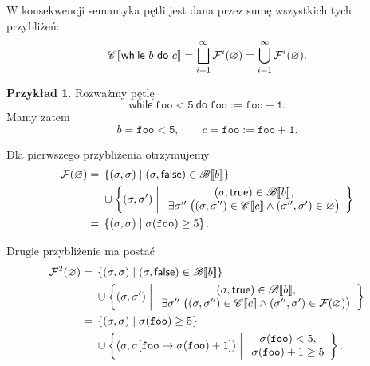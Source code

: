 \documentclass[11pt,a4paper]{article}
\theoremstyle{definition}
\newtheorem{przyklad}[definicja]{Przykład}
\theoremstyle{plain}
\DeclarePairedDelimiter{\semdelim}{\llbracket}{\rrbracket}
\newcommand{\sem}[1]{\semdelim{#1}}
\newcommand{\Cc}{\mathscr{C}}   %
\newcommand{\Bb}{\mathscr{B}}   %
\newcommand{\kw}[1]{\ensuremath{\mathsf{#1}}} %
\begin{document}
W konsekwencji semantyka pętli jest dana przez sumę wszystkich tych
przybliżeń:
\[
	\Cc\sem{\kw{while}\ b\ \kw{do}\ c}
	=
	\bigsqcup_{i=1}^{\infty}\mathcal{F}^i(\varnothing)
	=
	\bigcup_{i=1}^{\infty}\mathcal{F}^i(\varnothing).
\]



\begin{przyklad}
	Rozważmy pętlę
	\[
	\kw{while}\ \mathtt{foo}<\mathtt{5}\ \kw{do}\ 
	\mathtt{foo}:=\mathtt{foo}+\mathtt{1}.
	\]
	Mamy zatem
	\[
	b=\mathtt{foo}<\mathtt{5},
	\qquad
	c=\mathtt{foo}:=\mathtt{foo}+\mathtt{1}.
	\]
	
	Dla pierwszego przybliżenia otrzymujemy
	\[
	\begin{aligned}
		\mathcal{F}(\varnothing)
		={}&
		\left\{
		(\sigma,\sigma)
		\;\middle|\;
		(\sigma,\kw{false})\in\Bb\sem{b}
		\right\}\\
		&{}\cup
		\left\{
		(\sigma,\sigma')
		\;\middle|\;
		\begin{array}{c}
			(\sigma,\kw{true})\in\Bb\sem{b},\\
			\exists\sigma''\;
			\big(
			(\sigma,\sigma'')\in\Cc\sem{c}
			\land
			(\sigma'',\sigma')\in\varnothing
			\big)
		\end{array}
		\right\}\\
		={}&
		\left\{
		(\sigma,\sigma)
		\;\middle|\;
		\sigma(\mathtt{foo})\geq5
		\right\}.
	\end{aligned}
	\]
	
	Drugie przybliżenie ma postać
	\[
	\begin{aligned}
		\mathcal{F}^2(\varnothing)
		={}&
		\left\{
		(\sigma,\sigma)
		\;\middle|\;
		(\sigma,\kw{false})\in\Bb\sem{b}
		\right\}\\
		&{}\cup
		\left\{
		(\sigma,\sigma')
		\;\middle|\;
		\begin{array}{c}
			(\sigma,\kw{true})\in\Bb\sem{b},\\
			\exists\sigma''\;
			\big(
			(\sigma,\sigma'')\in\Cc\sem{c}
			\land
			(\sigma'',\sigma')\in\mathcal{F}(\varnothing)
			\big)
		\end{array}
		\right\}\\
		={}&
		\left\{
		(\sigma,\sigma)
		\;\middle|\;
		\sigma(\mathtt{foo})\geq5
		\right\}\\
		&{}\cup
		\left\{
		\left(
		\sigma,
		\sigma[\mathtt{foo}\mapsto\sigma(\mathtt{foo})+1]
		\right)
		\;\middle|\;
		\begin{array}{c}
			\sigma(\mathtt{foo})<5,\\
			\sigma(\mathtt{foo})+1\geq5
		\end{array}
		\right\}.
	\end{aligned}
	\]
	

\end{przyklad}
\end{document}
